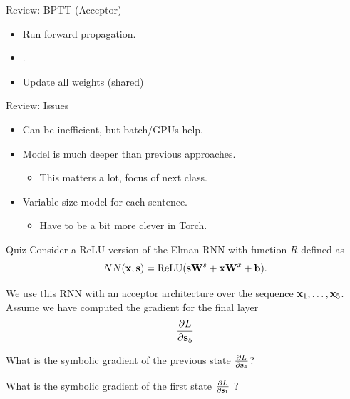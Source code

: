 \documentclass{beamer}
\begin{document}
\begin{frame}{Review: BPTT (Acceptor)}
  \begin{itemize}
  \item \alert{Run forward propagation}.
  \item {}.
  \item Update all weights (shared)
  \end{itemize}

    \begin{center}
    \end{center}
\end{frame}

\begin{frame}{Review: Issues}
  \begin{itemize}
  \item Can be inefficient, but batch/GPUs help.
    \air

  \item Model is much deeper than previous approaches.
    \begin{itemize}
    \item This matters a lot, focus of next class.
    \end{itemize}
    \air

  \item Variable-size model for each sentence.
    \begin{itemize}
    \item Have to be a bit more clever in Torch.
    \end{itemize}
  \end{itemize}
\end{frame}

\begin{frame}{Quiz}
  Consider a ReLU version of the Elman RNN with function $R$ defined as
    \[ NN(\boldx, \bolds) = \relu( \bolds \boldW^s  +  \boldx \boldW^x  + \boldb).\]
    
    We  use this RNN with an acceptor architecture over the sequence $\mathbf{x}_1, \ldots, \mathbf{x}_5$.
    Assume we have computed the gradient for the final layer 
    \[ \frac{\partial L}{\partial \mathbf{s}_5} \]   

    What is the symbolic gradient of the previous state
    $ \frac{\partial L}{\partial \mathbf{s}_4 }$?    
    
    \air 
    What is the symbolic gradient of the first state
    $ \frac{\partial L}{\partial \mathbf{s}_1 }$ ? 
\end{frame}
\end{document}
